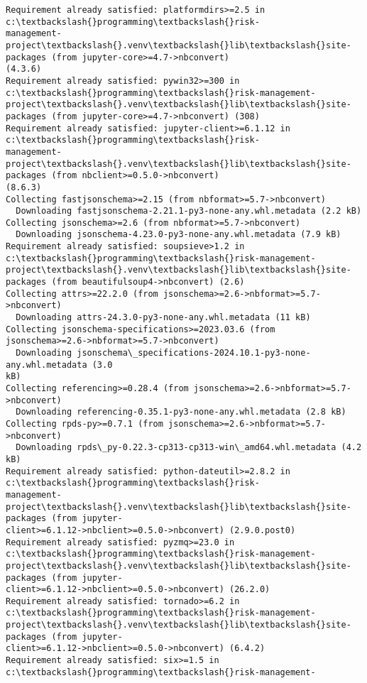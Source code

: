 \documentclass[11pt]{article}
\begin{document}
\begin{Verbatim}[commandchars=\\\{\}]
Requirement already satisfied: platformdirs>=2.5 in c:\textbackslash{}programming\textbackslash{}risk-
management-project\textbackslash{}.venv\textbackslash{}lib\textbackslash{}site-packages (from jupyter-core>=4.7->nbconvert)
(4.3.6)
Requirement already satisfied: pywin32>=300 in c:\textbackslash{}programming\textbackslash{}risk-management-
project\textbackslash{}.venv\textbackslash{}lib\textbackslash{}site-packages (from jupyter-core>=4.7->nbconvert) (308)
Requirement already satisfied: jupyter-client>=6.1.12 in c:\textbackslash{}programming\textbackslash{}risk-
management-project\textbackslash{}.venv\textbackslash{}lib\textbackslash{}site-packages (from nbclient>=0.5.0->nbconvert)
(8.6.3)
Collecting fastjsonschema>=2.15 (from nbformat>=5.7->nbconvert)
  Downloading fastjsonschema-2.21.1-py3-none-any.whl.metadata (2.2 kB)
Collecting jsonschema>=2.6 (from nbformat>=5.7->nbconvert)
  Downloading jsonschema-4.23.0-py3-none-any.whl.metadata (7.9 kB)
Requirement already satisfied: soupsieve>1.2 in c:\textbackslash{}programming\textbackslash{}risk-management-
project\textbackslash{}.venv\textbackslash{}lib\textbackslash{}site-packages (from beautifulsoup4->nbconvert) (2.6)
Collecting attrs>=22.2.0 (from jsonschema>=2.6->nbformat>=5.7->nbconvert)
  Downloading attrs-24.3.0-py3-none-any.whl.metadata (11 kB)
Collecting jsonschema-specifications>=2023.03.6 (from
jsonschema>=2.6->nbformat>=5.7->nbconvert)
  Downloading jsonschema\_specifications-2024.10.1-py3-none-any.whl.metadata (3.0
kB)
Collecting referencing>=0.28.4 (from jsonschema>=2.6->nbformat>=5.7->nbconvert)
  Downloading referencing-0.35.1-py3-none-any.whl.metadata (2.8 kB)
Collecting rpds-py>=0.7.1 (from jsonschema>=2.6->nbformat>=5.7->nbconvert)
  Downloading rpds\_py-0.22.3-cp313-cp313-win\_amd64.whl.metadata (4.2 kB)
Requirement already satisfied: python-dateutil>=2.8.2 in c:\textbackslash{}programming\textbackslash{}risk-
management-project\textbackslash{}.venv\textbackslash{}lib\textbackslash{}site-packages (from jupyter-
client>=6.1.12->nbclient>=0.5.0->nbconvert) (2.9.0.post0)
Requirement already satisfied: pyzmq>=23.0 in c:\textbackslash{}programming\textbackslash{}risk-management-
project\textbackslash{}.venv\textbackslash{}lib\textbackslash{}site-packages (from jupyter-
client>=6.1.12->nbclient>=0.5.0->nbconvert) (26.2.0)
Requirement already satisfied: tornado>=6.2 in c:\textbackslash{}programming\textbackslash{}risk-management-
project\textbackslash{}.venv\textbackslash{}lib\textbackslash{}site-packages (from jupyter-
client>=6.1.12->nbclient>=0.5.0->nbconvert) (6.4.2)
Requirement already satisfied: six>=1.5 in c:\textbackslash{}programming\textbackslash{}risk-management-

\end{Verbatim}
\end{document}
